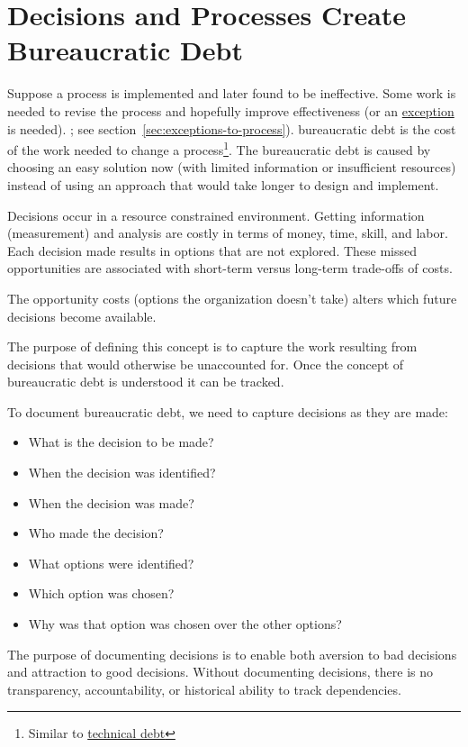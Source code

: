 \section{Decisions and Processes Create Bureaucratic Debt\label{sec:bureaucratic-debt}}


Suppose a \gls{process} is implemented and later found to be ineffective. Some work is needed to revise the process and hopefully improve effectiveness (or an \hyperref[sec:exceptions-to-process]{exception} is needed).
\ifsectionref
; see section~\ref{sec:exceptions-to-process}).
\fi
\gls{bureaucratic debt} is the cost of the work needed to change a process\footnote{Similar to \href{https://en.wikipedia.org/wiki/Technical_debt}{technical debt}}. The bureaucratic debt is caused by choosing an easy solution now (with limited information or insufficient resources) instead of using an approach that would take longer to design and implement.


Decisions occur in a resource constrained environment.
Getting information (measurement) and analysis are costly in terms of money, time, skill, and labor.
Each decision made results in options that are not explored. These missed opportunities are associated with short-term versus long-term trade-offs of costs.

The opportunity costs (options the organization doesn't take) alters which future decisions become available.

The purpose of defining this concept is to capture the work resulting from decisions that would otherwise be unaccounted for.
Once the concept of bureaucratic debt is understood it can be tracked.

To document bureaucratic debt, we need to capture decisions as they are made:
\begin{itemize}
    \item What is the decision to be made?
    \item When the decision was identified?
    \item When the decision was made?
    \item Who made the decision?
    \item What options were identified?
    \item Which option was chosen?
    \item Why was that option was chosen over the other options?
\end{itemize}
The purpose of documenting decisions is to enable both aversion to bad decisions and attraction to good decisions. Without documenting decisions, there is no transparency, accountability, or historical ability to track dependencies. 

